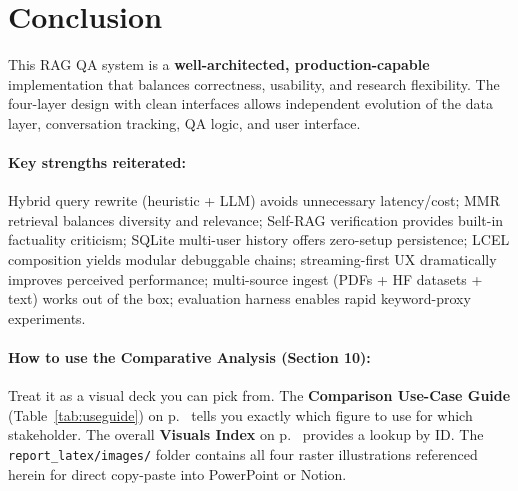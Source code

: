 \documentclass[12pt,a4paper]{article}
\begin{document}
\newpage

\section{Conclusion}

This RAG QA system is a \textbf{well-architected, production-capable} implementation that balances correctness, usability, and research flexibility. The four-layer design with clean interfaces allows independent evolution of the data layer, conversation tracking, QA logic, and user interface.

\paragraph{Key strengths reiterated:}
Hybrid query rewrite (heuristic + LLM) avoids unnecessary latency/cost; MMR retrieval balances diversity and relevance; Self-RAG verification provides built-in factuality criticism; SQLite multi-user history offers zero-setup persistence; LCEL composition yields modular debuggable chains; streaming-first UX dramatically improves perceived performance; multi-source ingest (PDFs + HF datasets + text) works out of the box; evaluation harness enables rapid keyword-proxy experiments.

\paragraph{How to use the Comparative Analysis (Section 10):} Treat it as a visual deck you can pick from. The \textbf{Comparison Use-Case Guide} (Table~\ref{tab:useguide}) on p.~\pageref{tab:useguide} tells you exactly which figure to use for which stakeholder. The overall \textbf{Visuals Index} on p.~\pageref{tab:visualsindex} provides a lookup by ID. The \texttt{report\_latex/images/} folder contains all four raster illustrations referenced herein for direct copy-paste into PowerPoint or Notion.
\end{document}

